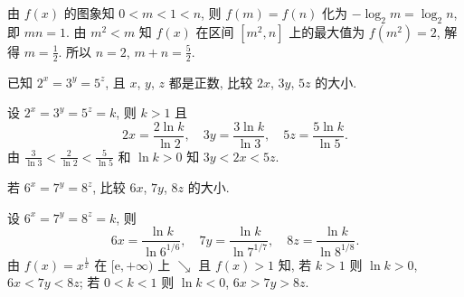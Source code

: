   \beginsolution
    由 $f(x)$ 的图象知 $0<m<1<n$, 
    则 $f(m)=f(n)$ 化为 $-\log_2 m=\log_2 n$, 即 $mn=1$. 由 $m^2<m$ 知 $f(x)$ 在区间 $[m^2,n]$ 上的最大值为 $f(m^2)=2$, 解得 $m=\frac12$. 所以 $n=2$, $m+n=\frac52$.
  \endsolution

  \begin{exercise}
    已知 $2^x =3^y =5^z$, 且 $x$, $y$, $z$ 都是正数, 
    比较 $2x$, $3y$, $5z$ 的大小.
  \end{exercise}
  
  \beginsolution
    设 $2^x=3^y=5^z=k$, 则 $k>1$ 且
    \[2x=\frac{2\ln k}{\ln 2},\quad 3y=\frac{3\ln k}{\ln 3},\quad 5z=\frac{5\ln k}{\ln 5}.\]
    由 $\frac{3}{\ln3}< \frac{2}{\ln2}< \frac{5}{\ln5}$ 和 $\ln k>0$ 知 $3y<2x<5z$.
    
    \varexercise 若 $6^x=7^y=8^z$, 比较 $6x$, $7y$, $8z$ 的大小.
    
    设 $6^x=7^y=8^z=k$, 则
    \[6x=\frac{\ln k}{\ln 6^{1/6}},\quad 7y=\frac{\ln k}{\ln 7^{1/7}},\quad 8z=\frac{\ln k}{\ln 8^{1/8}}.\]
    由 $f(x)=x^{\frac1x}$ 在 $[\mathrm{e},+\infty)$ 上 $\searrow$ 且 $f(x)>1$ 知, 若 $k>1$ 则 $\ln k>0$, $6x<7y<8z$; 若 $0<k<1$ 则 $\ln k<0$, $6x>7y>8z$.
  \endsolution
  
